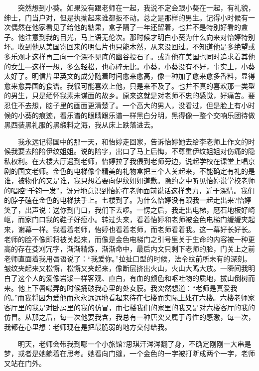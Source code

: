\documentclass[12pt,UTF8]{ctexbook}
\begin{document}
　　突然想到小葵。如果没有跟老师在一起，我说不定会跟小葵在一起，有礼貌，绅士，门当户对，但是执拗起来谁都扳不动。总之是那样的男生。记得小时候有一次偶然在他家看见了给他的糖果，盒子隔了一年还留着，也并不是特别好看的盒子。他注意到我的目光，马上语无伦次。那时候才明白小葵为什么向来对怡婷特别坏。收到他从美国寄回来的明信片也只能木然，从来没回过。不知道他是多绝望或多乐观才这样再三向一个深不见底的幽谷投石子。或许他在美国也同时追求着其他的女生---这样一想，多么轻松，也心碎无比。小葵，小葵没有不好，事实上，小葵太好了。明信片里英文的成分随着时间愈来愈高，像一种加了愈来愈多香料，显得愈来愈异国的食谱。我很可能喜欢上他，只是来不及了。也并不真的喜欢那一类型的男生，只是缅怀我素未谋面的故乡。原来这就是对老师不忠的感觉，好痛苦。要忍住不去想，脑子里的画面更清楚了。一个高大的男人，没看过，但是脸上有小时候的小葵的痕迹，看乐谱的眼睛跟乐谱一样黑白分明，黑得像一整个交响乐团待做黑西装黑礼服的黑缎料之海，我从床上跌落进去。

　　我永远记得国中的那一天，和怡婷走回家，告诉怡婷她去给李老师上作文的时候我要去陪陪伊纹姐姐。说的陪字，出口了马上后悔，不尊重伊纹姐姐对伤痛的隐私权利。在大楼大厅遇到老师，怡婷拉了我偎到老师旁边，说起学校在课堂上唱京剧的国文老师。金色的电梯像个精美的礼物盒把三个人关起来，不能确定有礼的是谁，被物化的又是谁，我只想着要向伊纹姐姐道歉。隐约之中听见怡婷说学校老师的唱腔\enquote{千钧一发}，讶异地意识到怡婷在老师面前说话这样卖力，近于深情。我们的脖子磕在金色的电梯扶手上。七楼到了。为什么怡婷没有跟我一起走出来?怡婷笑了，出声说：送你到门口，我们下去啰。一愣之后，我走出电梯，磨石地板好崎岖，而家门口我的鞋子好瘦小。转过头来，看着怡婷和老师被金色电梯门缓缓夹起来，谢幕一样。我看着老师，怡婷也看着老师，而老师看着我。这一幕好长好长。老师的脸不像即将被关起来，而像是金色电梯门之引号里关于生命的内容被一种更高的存在芟刈冗字，渐渐精炼，渐渐命中，最后内文只剩下老师的脸，门关上之前老师直面着我用唇语说了：\enquote{我爱你。}拉扯口型的时候，法令纹前所未有的深刻。皱纹夹起来又松懈，松懈又夹起来，像断层挤出火山，火山大鸣大放。一瞬间我明白了这个人的爱像岩浆一样客观、直白，有血的颜色和呕吐物的质地，拔山倒树而来。他上下唇嘬弄的时候捅破我心里的处女膜。我突然想道：\enquote{老师是真爱我的。}而我将因为爱他而永永远远地看起来待在七楼而实际上处在六楼。六楼老师家客厅里的我是对卧房里的我的仿冒，而七楼我们的家里的我又是对六楼客厅的我的仿冒。从那之后，每一次他要我含，我总有一种唐突又属于母性的感激，每一次，我都在心里想：老师现在是把最脆弱的地方交付给我。

　　明天，老师会带我到哪一个小旅馆?思琪汗涔涔翻了身，不确定刚刚一大串是梦，或者是她躺着在思考。她看向门缝，一个金色的一字被打断成两个一字，老师又站在门外。
\end{document}
